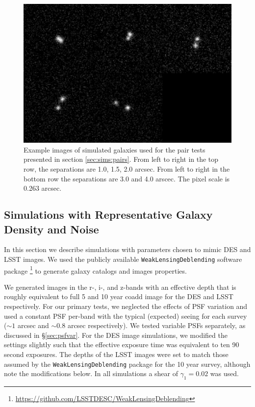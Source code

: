 \documentclass[iop, twocolappendix, appendixfloats, numberedappendix, apj]{hackemulateapj}
\begin{document}
\begin{figure}
    \begin{center}
        \includegraphics[width=\textwidth]{bdk-comb.png}
        \caption{Example images of simulated galaxies used for the pair tests
        presented in section \ref{sec:sims:pairs}.  From left to right in the top row,
        the separations are 1.0, 1.5, 2.0 arcsec. From left to right in the bottom row the
        separations are 3.0 and 4.0 arscec. The pixel scale is 0.263 arcsec.
        \label{fig:pairs}}
    \end{center}
\end{figure}

\subsection{Simulations with Representative Galaxy Density and Noise}
\label{sec:sims:realgals}

In this section we describe simulations with parameters chosen to mimic DES and
LSST images.  We used the publicly available \texttt{WeakLensingDeblending}
software package
\citep{WeakLensingDeblendingSoftware,WeakLensingDeblendingPaper}\footnote{\url{https://github.com/LSSTDESC/WeakLensingDeblending}}
to generate galaxy catalogs and images properties.

We generated images in the r-, i-, and z-bands with an effective depth that is
roughly equivalent to full 5 and 10 year coadd image for the DES and LSST
respectively. For our primary tests, we neglected the effects of PSF variation
and used a constant PSF per-band with the typical (expected) seeing for each
survey ($\sim\!1$ arcsec and $\sim\!0.8$ arcsec respectively). We tested
variable PSFs separately, as discussed in \S \ref{sec:psfvar}.  For the DES
image simulations, we modified the settings slightly such that the effective
exposure time was equivalent to ten 90 second exposures. The depths of the LSST
images were set to match those assumed by the \texttt{WeakLensingDeblending}
package for the 10 year survey, although note the modifications below. In all
simulations a shear of $\gamma_1 = 0.02$ was used.
\end{document}

